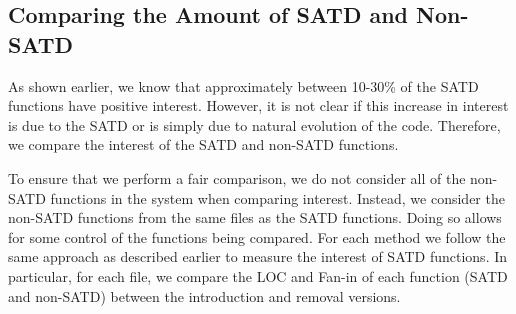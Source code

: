 \documentclass[10pt, conference]{IEEEtran}
\newcommand{\smallsection}[1]{\vspace{1mm}\noindent {\bf #1}.\hspace{2mm}}
\begin{document}
\subsection{Comparing the Amount of SATD and Non-SATD}
As shown earlier, we know that approximately between 10-30\% of the SATD functions have positive interest. However, it is not clear if this increase in interest is due to the SATD or is simply due to natural evolution of the code. Therefore, we compare the interest of the SATD and non-SATD functions. 

To ensure that we perform a fair comparison, we do not consider all of the non-SATD functions in the system when comparing interest. Instead, we consider the non-SATD functions from the same files as the SATD functions. Doing so allows for some control of the functions being compared. For each method we follow the same approach as described earlier to measure the interest of SATD functions. In particular, for each file, we compare the LOC and Fan-in of each function (SATD and non-SATD) between the introduction and removal versions.

 

%

\end{document}
